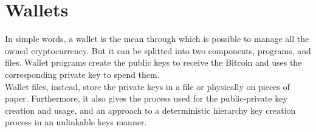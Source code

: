 \section{Wallets}
\label{sec:wallets}
In simple words, a wallet is the mean through which is possible to manage all the 
owned cryptocurrency. But it can be splitted into two components, programs, and files.
Wallet programs create the public keys to receive the Bitcoin and uses the 
corresponding private key to spend them.\\ 
Wallet files, instead, store the private keys in a file or physically on pieces of paper. 
Furthermore, it also gives the process used for the public-private key creation and 
usage, and  an approach to a deterministic hierarchy key creation process in an unlinkable
keys manner.
\newpage


